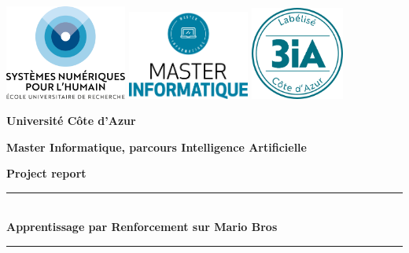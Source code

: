 \documentclass[a4paper,12pt]{article}
\begin{document}
    \begin{titlepage}
        \begin{center}
            \includegraphics[width=0.3\textwidth]{images/DS4HlogocouleurFR.png} \hfill
            \includegraphics[width=0.3\textwidth]{images/logo_master.png} \hfill
            \includegraphics[width=0.23\textwidth]{images/tampon-3IA.png}
            
            \vspace{1.5cm}
            
            \textbf{\LARGE Université C\^ote d'Azur}
            
            \vspace{0.5cm}
            
            \textbf{\Large Master Informatique, parcours Intelligence Artificielle}
            
            \vspace{1.5cm}
            
            \textbf{\Large Project report}
            
            \vspace{0.5cm}
            
            \rule{\linewidth}{0.5mm} \\[0.4cm]
            {\LARGE \bfseries Apprentissage par Renforcement sur Mario Bros \\[0.2cm]}
            \rule{\linewidth}{0.5mm} \\[1.5cm]
            

\end{center}
\end{titlepage}
\end{document}
